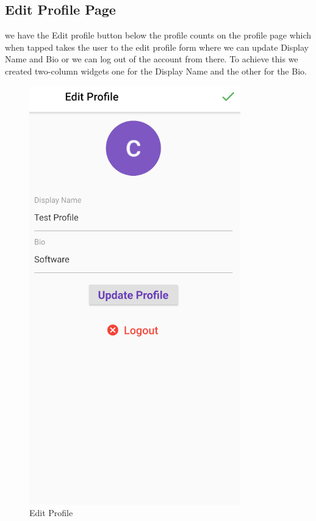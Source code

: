 \subsection{Edit Profile Page}
we have the Edit profile button below the profile counts on the profile page which when tapped takes the user to the edit profile form where we can update Display Name and Bio or we can log out of the account from there. To achieve this we created two-column widgets one for the Display Name and the other for the Bio.
\begin{figure}[!htb]
    \centering
    \includegraphics[scale=0.80]{AppScreenShots/edit profile.PNG}
    \caption{Edit Profile}
    \label{fig:Edit Profile}
\end{figure}
